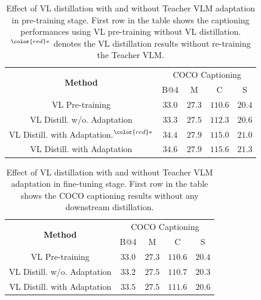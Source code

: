 \begin{table}[t!]
    \centering
    \setlength{\tabcolsep}{4.5pt} %
    \renewcommand{\arraystretch}{1.2} %
    \caption[Effect of VL distillation with and without Teacher VLM adaptation in pre-training stage.]{
    Effect of VL distillation with and without Teacher VLM adaptation in pre-training stage. First row in the table shows the captioning performances using VL pre-training without VL distillation. $^{\color{red} *}$ denotes the VL distillation results without re-training the Teacher VLM.
    }    
    { \small
    \begin{tabular}{c|cccc}
    \multirow{2}{*}{\textbf{Method}} & \multicolumn{4}{c}{{COCO Captioning }} \\ 
    & {B@4} & {M} & {C} & {S} \\
    \hline
    VL Pre-training & $33.0$ & $27.3$ & $110.6$ & $20.4$ \\
    VL Distill. w/o. Adaptation & $33.3$ & $27.5$ & $112.3$ & $20.6$ \\
    VL Distill. with Adaptation.$^{\color{red} *}$ &  $34.4$ & $27.9$ & $115.0$ & $21.0$\\
    VL Distill. with Adaptation & $34.6$ & $27.9$ & $115.6$ & $21.3$ \\

    \end{tabular}
    }
    \label{tab:vlpadapt1}
\end{table}

\begin{table}[t!]
    \centering
    \setlength{\tabcolsep}{5.pt} %
    \renewcommand{\arraystretch}{1.2} %
    \caption[Effect of VL distillation with and without Teacher VLM adaptation in fine-tuning stage.]{
    Effect of VL distillation with and without Teacher VLM adaptation in fine-tuning stage. First row in the table shows the COCO captioning results without any downstream distillation.
    }    
    { \small
    \begin{tabular}{c|cccc}
    \multirow{2}{*}{\textbf{Method}} & \multicolumn{4}{c}{{COCO Captioning}} \\
    & {B@4} & {M} & {C} & {S} \\
    \hline 
    VL Pre-training & $33.0$ & $27.3$ & $110.6$ & $20.4$ \\
    VL Distill. w/o. Adaptation & $33.2$   & $ 27.5$ & $110.7$  & $20.3$\\
    VL Distill. with Adaptation & $33.5$ & $27.5$ & $111.6$ & $20.6$\\
    \end{tabular}
    }
    \label{tab:vlpadapt2}
\end{table}

